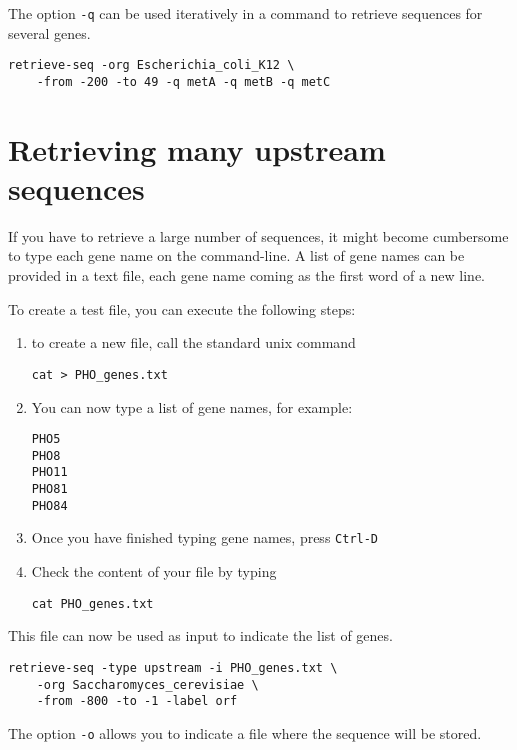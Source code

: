The option \texttt{-q} can be used iteratively in a command to
retrieve sequences for several genes.

\begin{verbatim}
retrieve-seq -org Escherichia_coli_K12 \
    -from -200 -to 49 -q metA -q metB -q metC
\end{verbatim}

\section{Retrieving many upstream sequences}

If you have to retrieve a large number of sequences, it might become
cumbersome to type each gene name on the command-line. A list of gene
names can be provided in a text file, each gene name coming as the
first word of a new line.

To create a test file, you can execute the following steps:
\begin{enumerate}
\item to create a new file, call the standard unix command 

\begin{verbatim}
cat > PHO_genes.txt
\end{verbatim} 

\item You can now type a list of gene names, for example:

\begin{verbatim}
PHO5
PHO8
PHO11
PHO81
PHO84
\end{verbatim} 

\item Once you have finished typing gene names, press \texttt{Ctrl-D}

\item Check the content of your file by typing 

\begin{verbatim}
cat PHO_genes.txt
\end{verbatim} 

\end{enumerate}

This file can now be used as input to indicate the list of genes.

\begin{verbatim}
retrieve-seq -type upstream -i PHO_genes.txt \
    -org Saccharomyces_cerevisiae \
    -from -800 -to -1 -label orf
\end{verbatim} 

The option \texttt{-o} allows you to indicate a file where the
sequence will be stored.

